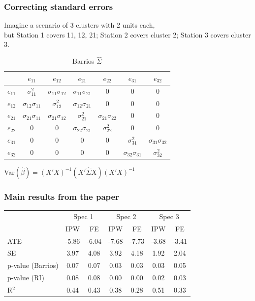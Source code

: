 \documentclass{beamer}
\begin{document}
\begin{frame}
\frametitle{Correcting standard errors}
Imagine a scenario of 3 clusters with 2 units each, \\
but Station 1 covers 11, 12, 21; Station 2 covers cluster 2; Station 3 covers cluster 3.
\begin{table}[h]
\caption{Barrios $\hat{\Sigma}$}
\begin{tabular}{ c|c c c c c c|}
 		 &  $e_{11}$ 		& $e_{12}$ 		& $e_{21}$ & $e_{22}$ & $e_{31}$ & $e_{32}$\\ \hline
$e_{11}$ & $\sigma_{11}^2$ & $\sigma_{11}\sigma_{12}$ 	   & $\sigma_{11}\sigma_{21}$ 		  & 0 		 & 0 		& 0 		\\
$e_{12}$ & $\sigma_{12}\sigma_{11}$  	 & $\sigma_{12}^2$ & $\sigma_{12}\sigma_{21}$ 		  & 0 		 & 0 		& 0 		\\
$e_{21}$ & $\sigma_{21}\sigma_{11}$  	& $\sigma_{21}\sigma_{12}$ 	   & $\sigma_{21}^2$ & $\sigma_{21}\sigma_{22}$ 		 & 0 		& 0 		\\
$e_{22}$ & 0			 & 0 	   & $\sigma_{22}\sigma_{21}$& $\sigma_{22}^2$ & 0 		& 0 		\\
$e_{31}$ & 0			 & 0 	   & 0 		  & 0 		 & $\sigma_{31}^2$ & $\sigma_{31}\sigma_{32}$\\
$e_{32}$ & 0			 & 0 	   & 0 		  & 0 		 & $\sigma_{32}\sigma_{31}$& $\sigma_{32}^2$ \\ \hline
\end{tabular}
\end{table}
Var$(\hat{\beta})=(X'X)^{-1}(X' \hat{\Sigma} X)(X'X)^{-1}$\\
\end{frame}





\begin{frame}
\frametitle{Main results from the paper}

\begin{table}[ht]
\centering
\begin{tabular}{lcccccc}
  \hline 
  & \multicolumn{2}{c}{Spec 1} &  \multicolumn{2}{c}{Spec 2} & \multicolumn{2}{c}{Spec 3} \\
 & IPW & FE & IPW & FE & IPW & FE \\ 
  \hline
ATE & -5.86 & -6.04 & -7.68 & -7.73 & -3.68 & -3.41 \\ 
  SE & 3.97 & 4.08 & 3.92 & 4.18 & 1.92 & 2.04 \\ 
  p-value (Barrios) & 0.07 & 0.07 & 0.03 & 0.03 & 0.03 & 0.05 \\ 
  p-value (RI) & 0.08 & 0.08 & 0.00 & 0.00 & 0.02 & 0.03 \\ 
  R$^2$ & 0.44 & 0.43 & 0.38 & 0.28 & 0.51 & 0.33 \\ 
   \hline
\end{tabular}
\end{table}


\end{frame}
\end{document}
